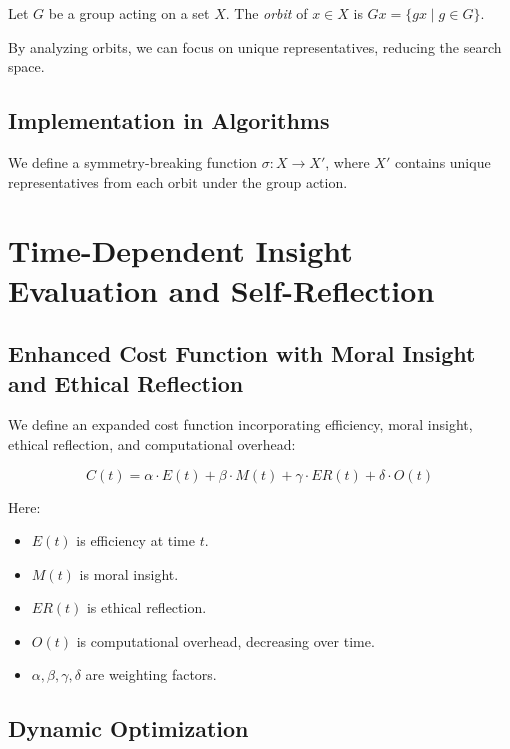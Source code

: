 \documentclass{article}
\begin{document}
\begin{definition}
Let \( G \) be a group acting on a set \( X \). The \textit{orbit} of \( x \in X \) is \( Gx = \{ gx \mid g \in G \} \).
\end{definition}

By analyzing orbits, we can focus on unique representatives, reducing the search space.

\subsection{Implementation in Algorithms}

We define a symmetry-breaking function \( \sigma: X \rightarrow X' \), where \( X' \) contains unique representatives from each orbit under the group action.

\section{Time-Dependent Insight Evaluation and Self-Reflection}

\subsection{Enhanced Cost Function with Moral Insight and Ethical Reflection}

We define an expanded cost function incorporating efficiency, moral insight, ethical reflection, and computational overhead:

\begin{equation}
C(t) = \alpha \cdot E(t) + \beta \cdot M(t) + \gamma \cdot ER(t) + \delta \cdot O(t)
\end{equation}

Here:
\begin{itemize}
    \item \( E(t) \) is efficiency at time \( t \).
    \item \( M(t) \) is moral insight.
    \item \( ER(t) \) is ethical reflection.
    \item \( O(t) \) is computational overhead, decreasing over time.
    \item \( \alpha, \beta, \gamma, \delta \) are weighting factors.
\end{itemize}

\subsection{Dynamic Optimization}
\end{document}
